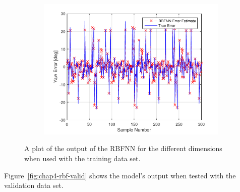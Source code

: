 \begin{figure}
\begin{subfigure}{0.3\textwidth}
    \caption{}
  \end{subfigure}
~
  \begin{subfigure}{0.3\textwidth}
    \includegraphics[width=\textwidth]{figures/chapter4/yaw_train}
    \caption{}
  \end{subfigure}
  \caption[The output of the RBFNN when used with the training set input.]{A plot of the output of the RBFNN for the different dimensions when used with the training data set.}
  \label{fig:chap4-rbf-train}
\end{figure}

Figure~\ref{fig:chap4-rbf-valid} shows the model's output when tested with the validation data set.

